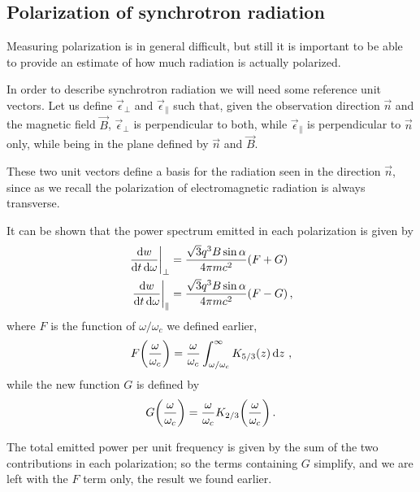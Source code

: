 \documentclass[main.tex]{subfiles}
\begin{document}
\subsection{Polarization of synchrotron radiation}


Measuring polarization is in general difficult, but still it is important to be able to provide an estimate of how much radiation is actually polarized. 

In order to describe synchrotron radiation we will need some reference unit vectors. Let us define \(\vec{\epsilon}_{\perp}\) and \(\vec{\epsilon}_{\parallel}\) such that, given the observation direction \(\vec{n}\) and the magnetic field \(\vec{B}\), \(\vec{\epsilon}_\perp\) is perpendicular to both, while \(\vec{\epsilon}_\parallel\) is perpendicular to \(\vec{n}\) only, while being in the plane defined by \(\vec{n}\) and \(\vec{B}\). 

These two unit vectors define a basis for the radiation seen in the direction \(\vec{n}\), since as we recall the polarization of electromagnetic radiation is always transverse. 

It can be shown that the power spectrum emitted in each polarization is given by 
%
\begin{align}
\eval{\frac{ \dd{w}}{ \dd{t} \dd{\omega }}}_{\perp} &= \frac{\sqrt{3} q^3 B \sin \alpha }{4 \pi m c^2} \qty(F + G) \\
\eval{\frac{ \dd{w}}{ \dd{t} \dd{\omega }}}_{\parallel} &= \frac{\sqrt{3} q^3 B \sin \alpha }{4 \pi m c^2} \qty(F - G)
\,,
\end{align}
%
where \(F\) is the function of \(\omega / \omega _c\) we defined earlier, 
%
\begin{align}
F \qty(\frac{\omega }{\omega _c}) = \frac{\omega}{\omega _c} \int_{\omega / \omega _c}^{\infty } K_{5/3} (z) \dd{z} 
\,,
\end{align}
%
while the new function \(G\) is defined by 
%
\begin{align}
G \qty(\frac{\omega }{\omega _c}) = \frac{\omega}{\omega _c} K_{2/3} \qty( \frac{\omega}{\omega _c})
\,.
\end{align}

The total emitted power per unit frequency is given by the sum of the two contributions in each polarization; so the terms containing \(G\) simplify, and we are left with the \(F\) term only, the result we found earlier. 
\end{document}
